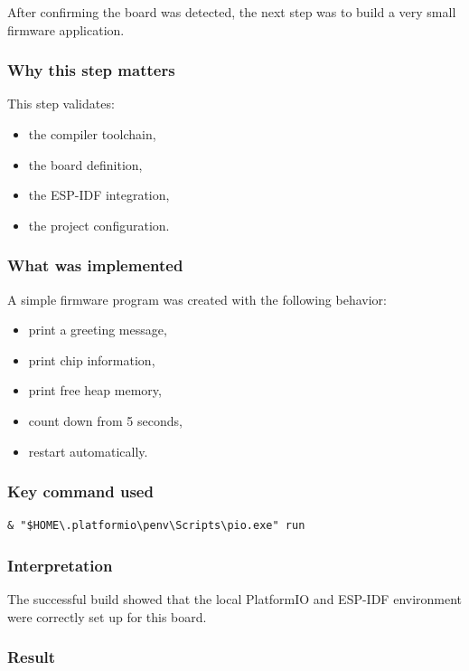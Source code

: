 \documentclass[12pt,a4paper]{article}
\begin{document}
After confirming the board was detected, the next step was to build a very
small firmware application.

\subsubsection*{Why this step matters}

This step validates:

\begin{itemize}
    \item the compiler toolchain,
    \item the board definition,
    \item the ESP-IDF integration,
    \item the project configuration.
\end{itemize}

\subsubsection*{What was implemented}

A simple firmware program was created with the following behavior:

\begin{itemize}
    \item print a greeting message,
    \item print chip information,
    \item print free heap memory,
    \item count down from 5 seconds,
    \item restart automatically.
\end{itemize}

\subsubsection*{Key command used}

\begin{lstlisting}
& "$HOME\.platformio\penv\Scripts\pio.exe" run
\end{lstlisting}

\subsubsection*{Interpretation}

The successful build showed that the local PlatformIO and ESP-IDF environment
were correctly set up for this board.

\subsubsection*{Result}
\end{document}
